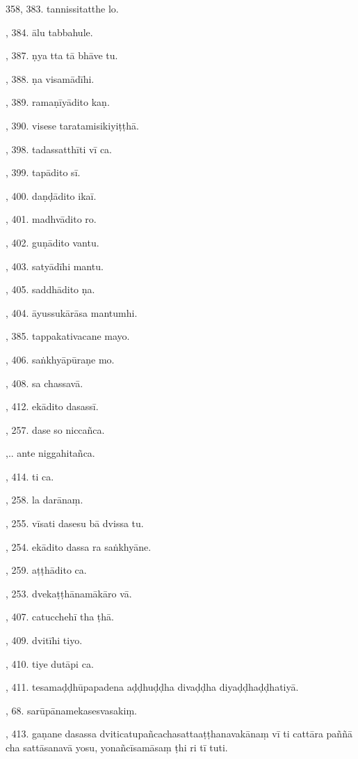358, 383. tannissitatthe lo.\par {}, 384. ālu tabbahule.\par {}, 387. ṇya tta tā bhāve tu.\par {}, 388. ṇa visamādīhi.\par {}, 389. ramaṇīyādito kaṇ.\par {}, 390. visese taratamisikiyiṭṭhā.\par {}, 398. tadassatthīti vī ca.\par {}, 399. tapādito sī.\par {}, 400. daṇḍādito ikaī.\par {}, 401. madhvādito ro.\par {}, 402. guṇādito vantu.\par {}, 403. satyādīhi mantu.\par {}, 405. saddhādito ṇa.\par {}, 404. āyussukārāsa mantumhi.\par {}, 385. tappakativacane mayo.\par {}, 406. saṅkhyāpūraṇe mo.\par {}, 408. sa chassavā.\par {}, 412. ekādito dasassī.\par {}, 257. dase so niccañca.\par {},.. ante niggahitañca.\par {}, 414. ti ca.\par {}, 258. la darānaṃ.\par {}, 255. vīsati dasesu bā dvissa tu.\par {}, 254. ekādito dassa ra saṅkhyāne.\par {}, 259. aṭṭhādito ca.\par {}, 253. dvekaṭṭhānamākāro vā.\par {}, 407. catucchehī tha ṭhā.\par {}, 409. dvitīhi tiyo.\par {}, 410. tiye dutāpi ca.\par {}, 411. tesamaḍḍhūpapadena aḍḍhuḍḍha divaḍḍha diyaḍḍhaḍḍhatiyā.\par {}, 68. sarūpānamekasesvasakiṃ.\par {}, 413. gaṇane dasassa dviticatupañcachasattaaṭṭhanavakānaṃ vī ti cattāra paññā cha sattāsanavā yosu, yonañcīsamāsaṃ ṭhi ri tī tuti.\par \noindent
